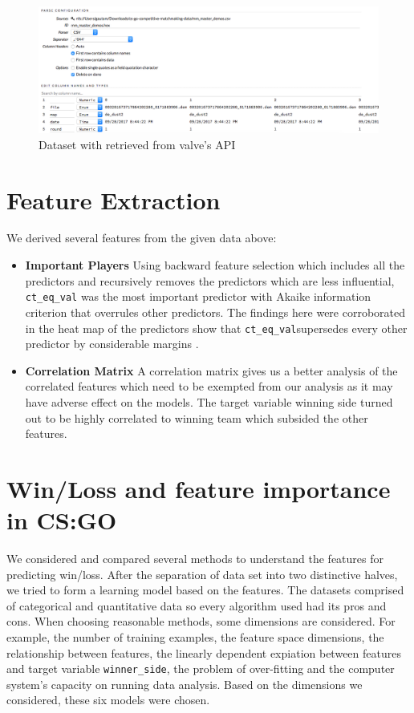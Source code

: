 \documentclass[conference]{IEEEtran}
\begin{document}
\begin{figure}[!t]
\includegraphics[width=\linewidth]{tab1.png}
\caption{Dataset with retrieved from valve's API}
\label{fig_sim}
\end{figure}


\section{Feature Extraction}
We derived several features from the given data above: 
\begin{itemize}
  \item \textbf{Important Players}  Using backward feature selection which includes all the predictors and recursively removes the predictors which are less influential, \texttt{ct\_eq\_val} was the most important predictor with Akaike information criterion that overrules other predictors. The findings here were corroborated in the heat map of the predictors show that \texttt{ct\_eq\_val}supersedes every other predictor by considerable margins \cite{Patterson}. 
  \item \textbf{Correlation Matrix} A correlation matrix gives us a better analysis of the correlated features which need to be exempted from our analysis as it may have adverse effect on the models. The target variable winning side turned out to be highly correlated to winning team which subsided the other features.
\end{itemize}

\section{ Win/Loss and feature importance in CS:GO }


We considered and compared several methods to understand the features for predicting win/loss. 
After the separation of data set into two distinctive halves, we tried to form a learning model based on the features. The datasets comprised of categorical and quantitative data so every algorithm used had its pros and cons. When choosing reasonable methods, some dimensions are considered. For example, the number of training examples, the feature space dimensions, the relationship between features, the linearly dependent expiation between features and target variable \texttt{winner\_side}, the problem of over-fitting and the computer system’s capacity on running data analysis. Based on the dimensions we considered, these six models were chosen.
\end{document}
